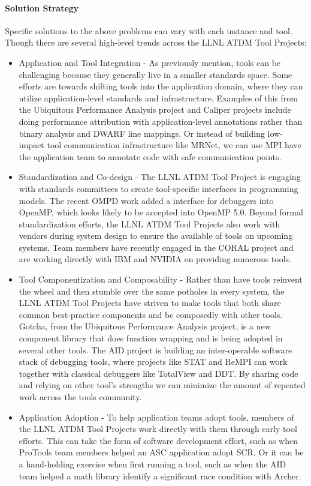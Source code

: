 \paragraph{Solution Strategy}
Specific solutions to the above problems can vary with each instance and tool.  Though there are several high-level trends across the LLNL ATDM Tool Projects:
\begin{itemize}
\itemsep 0em
\item Application and Tool Integration - As previously mention, tools can be challenging because they generally live in a smaller standards space.  Some efforts are towards shifting tools into the application domain, where they can utilize application-level standards and infrastructure.  Examples of this from the Ubiquitous Performance Analysis project and Caliper projects include doing performance attribution with application-level annotations rather than binary analysis and DWARF line mappings.  Or instead of building low-impact tool communication infrastructure like MRNet, we can use MPI have the application team to annotate code with safe communication points.
\item Standardization and Co-design - The LLNL ATDM Tool Project is engaging with standards committees to create tool-specific interfaces in programming models.  The recent OMPD work added a interface for debuggers into OpenMP, which looks likely to be accepted into OpenMP 5.0.  Beyond formal standardization efforts, the LLNL ATDM Tool Projects also work with vendors during system design to ensure the available of tools on upcoming systems.  Team members have recently engaged in the CORAL project and are working directly with IBM and NVIDIA on providing numerous tools.
\item Tool Componentization and Composability - Rather than have tools reinvent the wheel and then stumble over the same potholes in every system, the LLNL ATDM Tool Projects have striven to make tools that both share common best-practice components and be composedly with other tools.  Gotcha, from the Ubiquitous Performance Analysis project, is a new component library that does function wrapping and is being adopted in several other tools.  The AID project is building an inter-operable software stack of debugging tools, where projects like STAT and ReMPI can work together with classical debuggers like TotalView and DDT.  By sharing code and relying on other tool's strengths we can minimize the amount of repeated work across the tools community.
\item Application Adoption - To help application teams adopt tools, members of the LLNL ATDM Tool Projects work directly with them through early tool efforts.  This can take the form of software development effort, such as when ProTools team members helped an ASC application adopt SCR.  Or it can be a hand-holding exercise when first running a tool, such as when the AID team helped a math library identify a significant race condition with Archer.
\end{itemize}


